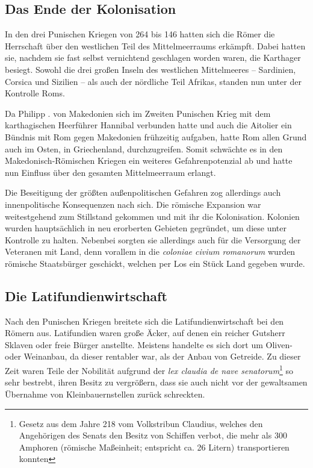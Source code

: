 \documentclass[
    12pt,
    smallheadings,
    ]{scrreprt}
\newcommand{\RM}[1]{\MakeUppercase{\romannumeral #1}}
\begin{document}
        \subsection{Das Ende der Kolonisation}
In den drei Punischen Kriegen von 264 bis 146 hatten sich die Römer die Herrschaft über den westlichen Teil des Mittelmeerraums erkämpft.
Dabei hatten sie, nachdem sie fast selbst vernichtend geschlagen worden waren, die Karthager besiegt.
Sowohl die drei großen Inseln des westlichen Mittelmeeres -- Sardinien, Corsica und Sizilien -- als auch der nördliche Teil Afrikas, standen nun unter der Kontrolle Roms.

Da Philipp \RM{5}. von Makedonien sich im Zweiten Punischen Krieg mit dem karthagischen Heerführer Hannibal verbunden hatte und auch die Aitolier ein Bündnis mit Rom gegen Makedonien frühzeitig aufgaben, hatte Rom allen Grund auch im Osten, in Griechenland, durchzugreifen.
Somit schwächte es in den Makedonisch-Römischen Kriegen ein weiteres Gefahrenpotenzial ab und hatte nun Einfluss über den gesamten Mittelmeerraum erlangt.

Die Beseitigung der größten außenpolitischen Gefahren zog allerdings auch innenpolitische Konsequenzen nach sich.
Die römische Expansion war weitestgehend zum Stillstand gekommen und mit ihr die Kolonisation.
Kolonien wurden hauptsächlich in neu erorberten Gebieten gegründet, um diese unter Kontrolle zu halten.
Nebenbei sorgten sie allerdings auch für die Versorgung der Veteranen mit Land, denn vorallem in die \textit{coloniae civium romanorum} wurden römische Staatsbürger geschickt, welchen per Los ein Stück Land gegeben wurde.


        \subsection{Die Latifundienwirtschaft}
\label{Latifundien}
Nach den Punischen Kriegen breitete sich die Latifundienwirtschaft bei den Römern aus.
Latifundien waren große Äcker, auf denen ein reicher Gutsherr Sklaven oder freie Bürger anstellte.
Meistens handelte es sich dort um Oliven- oder Weinanbau, da dieser rentabler war, als der Anbau von Getreide.
Zu dieser Zeit waren Teile der Nobilität aufgrund der \textit{lex claudia de nave senatorum}\footnote{Gesetz aus dem Jahre 218 vom Volkstribun Claudius, welches den Angehörigen des Senats den Besitz von Schiffen verbot, die mehr als 300 Amphoren (römische Maßeinheit; entspricht ca. 26 Litern) transportieren konnten} so sehr bestrebt, ihren Besitz zu vergrößern, dass sie auch nicht vor der gewaltsamen Übernahme von Kleinbauernstellen zurück schreckten.
\end{document}
